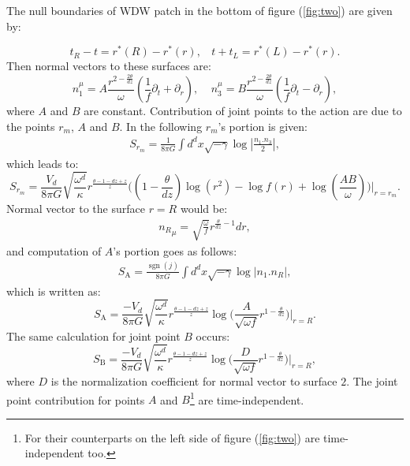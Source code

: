 \documentclass[]{article}
\DeclareMathOperator{\sgn}{sgn}
\begin{document}
The null boundaries of WDW patch in the bottom of figure (\ref{fig:two}) are given by:

\begin{equation}
t_R-t=r^*(R)-r^*(r),~~~~t+t_L=r^*(L)-r^*(r).
\end{equation}
Then normal vectors to these surfaces are:
\begin{equation}
n_1^\mu=A\frac{r^{2-\frac{2\theta}{dz}}}{\omega}(\frac{1}{f}\partial_t+\partial_r),~~~~~n_3^\mu=B\frac{r^{2-\frac{2\theta}{dz}}}{\omega}(\frac{1}{f}\partial_t-\partial_r),
\end{equation}
where $A$ and $B$ are constant. Contribution of joint points to the action are due to the points $r_m$, $A$ and $B$. In the following $r_m$'s portion is given:
\begin{align}
S_{r_m}=\frac{1}{8\pi G}\int d^dx \sqrt{-\gamma} \log|\frac{n_1.n_3}{2}|,
\end{align}
which leads to:
\begin{equation}
S_{r_m}=\frac{V_d}{8\pi G}\sqrt{\frac{\omega^d}{\kappa}}r^{\frac{\theta-1-dz+z}{z}}\Big((1-\frac{\theta}{dz})\log(r^2)- \log f(r)+\log(\frac{AB}{\omega})\Big)\Big|_{r=r_m}.\label{m}
\end{equation}
Normal vector to the surface $r=R$ would be:
\begin{align}
{n_R}_{\mu}=\sqrt{\frac{\omega}{f}}r^{\frac{\theta}{dz}-1}dr,
\end{align}
and computation of $A$'s portion goes as follows:
\begin{align}
S_{\text{A}}=\frac{\sgn(j)}{8\pi G}\int d^dx \sqrt{-\gamma} \log|n_1.n_R|,
\end{align}
which is written as:
\begin{equation}
S_{\text{A}}=\frac{-V_d}{8\pi G}\sqrt{\frac{\omega^d}{\kappa}} r^{\frac{\theta-1-dz+z}{z}} \log\Big(\frac{A}{\sqrt{\omega f}}r^{1-\frac{\theta}{dz}}\Big)\Big|_{r=R}.\label{a}
\end{equation}
The same calculation for joint point $B$ occurs:
\begin{equation}
S_{\text{B}}=\frac{-V_d}{8\pi G}\sqrt{\frac{\omega^d}{\kappa}} r^{\frac{\theta-1-dz+z}{z}} \log\Big(\frac{D}{\sqrt{\omega f}}r^{1-\frac{\theta}{dz}}\Big)\Big|_{r=R}, \label{b}
\end{equation}
where $D$ is the normalization coefficient for normal vector to surface $2$. The joint point contribution for points $A$ and $B$\footnote{For their counterparts on the left side of figure (\ref{fig:two}) are time-independent too.} are time-independent.
\end{document}
